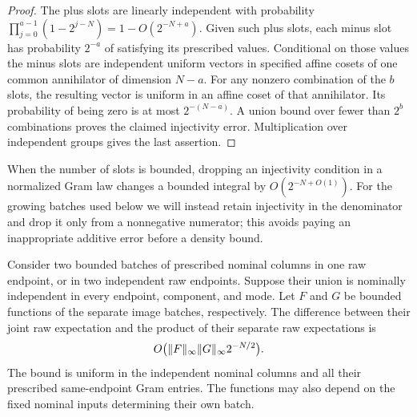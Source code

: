 \begin{proof}
The plus slots are linearly independent with probability
$\prod_{j=0}^{a-1}(1-2^{j-N})=1-O(2^{-N+a})$. Given such plus slots,
each minus slot has probability $2^{-a}$ of satisfying its prescribed
values. Conditional on those values the minus slots are independent
uniform vectors in specified affine cosets of one common annihilator
of dimension $N-a$. For any nonzero combination of the $b$ slots,
the resulting vector is uniform in an affine coset of that annihilator.
Its probability of being zero is at most $2^{-(N-a)}$. A union bound
over fewer than $2^b$ combinations proves the claimed injectivity error.
Multiplication over independent groups gives the last assertion.
\end{proof}

When the number of slots is bounded, dropping an injectivity condition
in a normalized Gram law changes a bounded integral by
$O(2^{-N+O(1)})$. For the growing batches used below we will instead
retain injectivity in the denominator and drop it only from a
nonnegative numerator; this avoids paying an inappropriate additive
error before a density bound.

\begin{lemma}
\label{lem:histogram-batch-comparison}
Consider two bounded batches of prescribed nominal columns in one raw
endpoint, or in two independent raw endpoints. Suppose their union is
nominally independent in every endpoint, component, and mode. Let $F$
and $G$ be bounded functions of the separate image batches, respectively.
The difference between their joint raw expectation and the product of
their separate raw expectations is
\[
 O\bigl(\lVert F\rVert_\infty\lVert G\rVert_\infty 2^{-N/2}\bigr).
\]
The bound is uniform in the independent nominal columns and all their
prescribed same-endpoint Gram entries. The functions may also depend
on the fixed nominal inputs determining their own batch.
\end{lemma}

